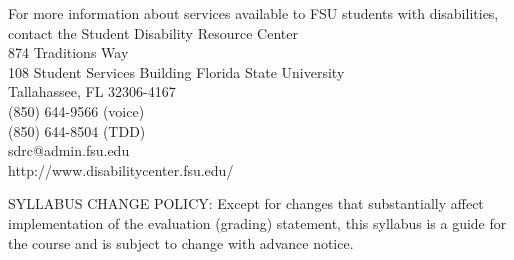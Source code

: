 \documentclass[12pt,oneside]{amsart}
\begin{document}
For more information about services available to FSU students with disabilities, contact the
 Student Disability Resource Center
\\
874 Traditions Way
\\
108 Student Services Building
Florida State University
\\
Tallahassee, FL 32306-4167
\\
(850) 644-9566 (voice)
\\
(850) 644-8504 (TDD)
\\
sdrc@admin.fsu.edu
\\
http://www.disabilitycenter.fsu.edu/



\noindent SYLLABUS CHANGE POLICY:
Except for changes that substantially affect implementation of the evaluation (grading) statement, this syllabus is a guide for the course and is subject to change with advance notice.
\end{document}
